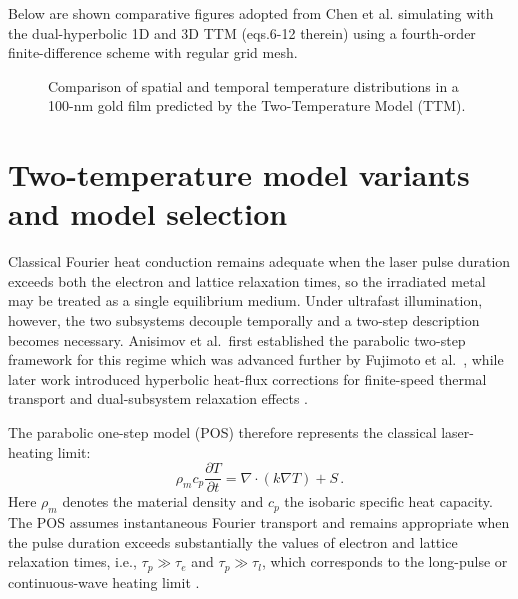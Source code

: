   Below are shown comparative figures adopted from Chen et al. \cite{Chen_2002}
  simulating with the dual-hyperbolic 1D and 3D TTM (eqs.6-12 therein) using a fourth-order finite-difference scheme with regular grid mesh.

  \begin{figure}[H]
    \centering
    \subfloat[Electron temperature profile across the thickness ($z$-axis) at $\varrho=0$ for a 100-nm gold film\\($\tau_p=100$~fs, $F=4107$~J/m$^2$, $w_0=500$~nm). \cite{Chen_2002}]{
      \PublicFigureOmitted[0.44\linewidth]
      \label{fig:ttm-Te-profile}
    }
    \hfill
    \subfloat[Temporal evolution of electron ($T_e$) and lattice ($T_l$) temperatures at the front surface centre ($\varrho=0, z=0$) for a 100-nm gold film ($\tau_p=100$~fs, $F=4107$~J/m$^2$, $w_0=2.0$~$\mu$m). \cite{Chen_2002}]{
      \PublicFigureOmitted[0.44\linewidth]
      \label{fig:ttm-temp-history}
    }
    \caption{Comparison of spatial and temporal temperature distributions in a 100-nm gold film predicted by the Two-Temperature Model (TTM).}
    \label{fig:ttm_1d_vs_3d}
  \end{figure}

  \section{Two-temperature model variants and model selection}
  \label{sec:ch1-ttm-variants}

  Classical Fourier heat conduction remains adequate when the laser pulse duration exceeds both the electron and lattice relaxation times, so the irradiated metal may be treated as a single equilibrium medium. Under ultrafast illumination, however, the two subsystems decouple temporally and a two-step description becomes necessary. Anisimov et al.\ first established the parabolic two-step framework for this regime \cite{Anisimov_1974} which was advanced further by Fujimoto et al.\ \cite{Fujimoto_1984},
  while later work introduced hyperbolic heat-flux corrections for finite-speed thermal transport and dual-subsystem relaxation effects \cite{Qiu_1992, Bai_1995, Chen_2001}.

  The parabolic one-step model (POS) therefore represents the classical laser-heating limit:
  \begin{equation*}
    \rho_m c_p \frac{\partial T}{\partial t} = \nabla \cdot (k \nabla T) + S \, .
  \end{equation*}
  Here \(\rho_m\) denotes the material density and \(c_p\) the isobaric specific heat capacity. The POS assumes instantaneous Fourier transport and remains appropriate when the pulse duration exceeds substantially the values of electron and lattice relaxation times, i.e., \(\tau_p \gg \tau_e\) and \(\tau_p \gg \tau_l\), which corresponds to the long-pulse or continuous-wave heating limit \cite{Tzou_2014ch1}.

